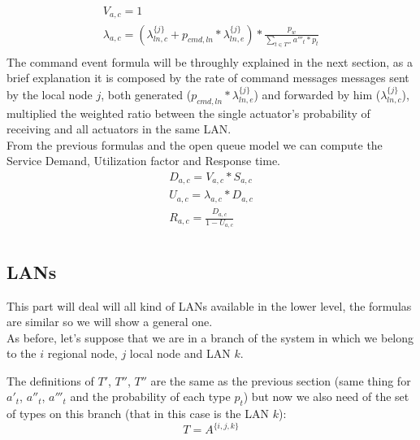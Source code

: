 \documentclass[11pt]{article}
\begin{document}
\begin{equation}
	\begin{array}{l}
		V_{a,c} = 1 \\
        \lambda_{a, c}= (\lambda^{\{j\}}_{ln, c} + p_{cmd,ln} * \lambda^{\{j\}}_{ln, e}) * \frac{p_{w}}{\sum\limits_{t \in T'''}{a'''_{t} * p_{t}}}   \\\
	\end{array}
\end{equation}
The command event formula will be throughly explained in the next section, as a brief explanation it is composed by the rate of command messages messages sent by the local node $j$, both generated ($p_{cmd,ln} * \lambda^{\{j\}}_{ln, e}$) and forwarded by him ($\lambda^{\{j\}}_{ln, c}$), multiplied the weighted ratio between the single actuator's probability of receiving and all actuators in the same LAN.\\
From the previous formulas and the open queue model we can compute the Service Demand, Utilization factor and Response time.
\begin{equation}
	\begin{array}{l}
		D_{a, c} = V_{a, c} * S_{a, c} \\
		U_{a, c} = \lambda_{a, c} * D_{a, c} \\
		R_{a, c} = \frac{D_{a, c}}{1 - U_{a,c}} \\
	\end{array}
\end{equation}



\subsection{LANs}
This part will deal will all kind of LANs available in the lower level, the formulas are similar so we will show a general one.\\
As before, let's suppose that we are in a branch of the system in which we belong to the $i$ regional node, $j$ local node and LAN $k$.

The definitions of $T'$, $T''$, $T''$ are the same as the previous section (same thing for $a'_t$, $a''_t$, $a'''_t$ and the probability of each type $p_t$) but now we also need of the set of types on this branch (that in this case is the LAN $k$):
\begin{equation}
    T = A^{\{i, j, k\}}
\end{equation}
\end{document}
